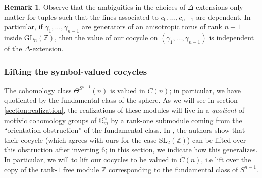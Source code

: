 \documentclass[10pt]{amsart}
\theoremstyle{definition}
\newtheorem{rem}[thm]{Remark}
\newcommand{\Z}{\mathbb{Z}}
\newcommand{\SL}{\mathrm{SL}}
\newcommand{\GL}{\mathrm{GL}}
\numberwithin{equation}{section}
\begin{document}
    \begin{rem} \label{rem:inddelta}
    Observe that the ambiguities in the choices of $\Delta$-extensions only matter for tuples such that the lines associated to $c_0,\ldots, c_{n-1}$ are dependent. In particular, if $\gamma_1,\ldots, \gamma_{n-1}$ are generators of an anisotropic torus of rank $n-1$ inside $\GL_n(\Z)$, then the value of our cocycle on $(\gamma_1,\ldots, \gamma_{n-1})$ is independent of the $\Delta$-extension.
    \end{rem}

    \subsubsection{Lifting the symbol-valued cocycles} \label{section:lift}

    The cohomology class $\Theta^{S^{n-1}}(n)$ is valued in $C(n)$; in particular, we have quotiented by the fundamental class of the sphere. As we will see in section \ref{section:realization}, the realizations of these modules will live in a \emph{quotient} of motivic cohomology groups of $\mathbb{G}_m^n$ by a rank-one submodule coming from the ``orientation obstruction'' of the fundamental class. In \cite[\S5]{SV}, the authors show that their cocycle (which agrees with ours for the case $\SL_2(\Z)$) can be lifted over this obstruction after inverting $6$; in this section, we indicate how this generalizes. In particular, we will to lift our cocycles to be valued in $\tilde{C}(n)$, i.e lift over the copy of the rank-$1$ free module $\mathbb{Z}$ corresponding to the fundamental class of $S^{n-1}$. 
    
\end{document}
